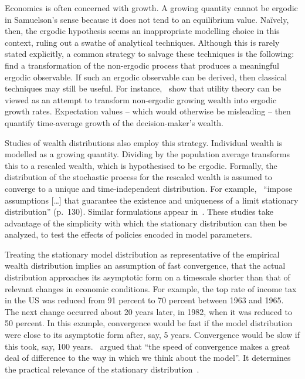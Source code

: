 Economics is often concerned with growth. A growing quantity cannot be ergodic in Samuelson's sense because it does not tend to an equilibrium value. Na\"ively, then, the ergodic hypothesis seems an inappropriate modelling choice in this context, ruling out a swathe of analytical techniques. Although this is rarely stated explicitly, a common strategy to salvage these techniques is the following: find a transformation of the non-ergodic process that produces a meaningful ergodic observable. 
If such an ergodic observable can be derived, then classical techniques may still be useful. For instance,~\cite{PetersGell-Mann2016} show that utility theory can be viewed as an attempt to transform non-ergodic growing wealth into ergodic growth rates. Expectation values -- which would otherwise be misleading -- then quantify time-average growth of the decision-maker's wealth.

Studies of wealth distributions also employ this strategy. Individual wealth is modelled as a growing quantity. Dividing by the population average transforms this to a rescaled wealth, which is hypothesised to be ergodic. Formally, the distribution of the stochastic process for the rescaled wealth is assumed to converge to a unique and time-independent distribution. For example,~\cite{BenhabibBisinZhu2011} ``impose assumptions [\ldots] that guarantee the existence and uniqueness of a limit stationary distribution'' (p.~130). Similar formulations appear in~\cite{stiglitz1969distribution,bewley1977permanent,piketty2013theory,de2015quantitative,de2015piketty,jones2015pareto}. These studies take advantage of the simplicity with which the stationary distribution can then be analyzed, \eg to test the effects of policies encoded in model parameters.

Treating the stationary model distribution as representative of the empirical wealth distribution implies an assumption of fast convergence, \ie that the actual distribution approaches its asymptotic form on a timescale shorter than that of relevant changes in economic conditions. For example, the top rate of income tax in the US was reduced from 91 percent to 70 percent between 1963 and 1965. The next change occurred about 20 years later, in 1982, when it was reduced to 50 percent. In this example, convergence would be fast if the model distribution were close to its asymptotic form after, say, 5 years. Convergence would be slow if this took, say, 100 years.~\cite[p.~137] {atkinson1969timescale} argued that ``the speed of convergence makes a great deal of difference to the way in which we think about the model''. It determines the practical relevance of the stationary distribution~\cite{atkinson1969timescale,cowell2014piketty}.

